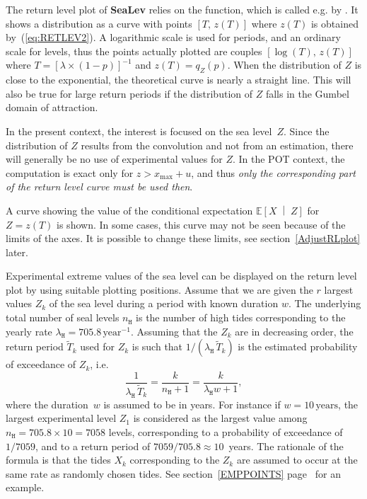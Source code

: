 \documentclass[11pt,a4paper]{report}\usepackage[]{graphicx}\usepackage[]{color}
\newcommand{\Esp}{\mathbb{E}}
\newcommand{\bCond}[2]{\left[ #1 \;\middle\vert\; #2 \right]}
\newcommand{\Up}[1]{#1_{\mathrm{max}}}
\begin{document}
The return level plot of \textbf{SeaLev} relies on the \verb@RSLplot@
function, which is called e.g. by \verb@convSL@. It shows a distribution as
a curve with points $[T,\,z(T)]$ where $z(T)$ is obtained
by~(\ref{eq:RETLEV2}). A logarithmic scale is used for periods, and an
ordinary scale for levels, thus the points actually plotted are
couples $[\log(T),\,z(T)]$ where $T = [\lambda \times(1-p)]^{-1}$ and
$z(T)= q_Z(p)$. When the distribution of $Z$ is close to the
exponential, the theoretical curve is nearly a straight line. This
will also be true for large return periods if the distribution of $Z$
falls in the Gumbel domain of attraction.

In the present context, the interest is focused on the sea level~$Z$.
Since the distribution of $Z$ results from the convolution and not from an
estimation, there will generally be no use of experimental
values for $Z$. In the POT context, the computation is exact only
for $z > \Up{x} + u$, and thus \textit{only the corresponding part of the
return level curve must be used then}.

A curve showing the value of the conditional expectation $\Esp\bCond{X}{Z}$
for $Z = z(T)$ is shown. In some cases, this curve may not be seen because
of the limits of the axes. It is possible to change these limits, see
section~\ref{AdjustRLplot} later.

Experimental extreme values of the sea level can be displayed on the return
level plot by using suitable plotting positions.  
Assume that we are given the $r$ largest values $Z_k$ of the sea level during a
period with known duration $w$. The underlying total number of seal levels
$n_{\texttt{H}}$ is the number of high tides corresponding to the yearly rate
$\lambda_{\texttt{H}} =705.8\,{\textrm{year}}^{-1}$. Assuming that the $Z_k$ are
in decreasing order, the return period $\widetilde{T}_k$ used for $Z_k$ is such
that $1/(\lambda_{\texttt{H}}\,\widetilde{T}_k)$ is the estimated probability of
exceedance of $Z_k$, i.e.
$$
    \frac{1}{\lambda_{\texttt{H}}\,\widetilde{T}_k} = \frac{k}{n_{\texttt{H}}+1} = 
    \frac{k}{\lambda_{\texttt{H}} w +1}, 
$$
where the duration~$w$ is assumed to be in years. For instance if $w=10\,\textrm{years}$,
the largest experimental level $Z_1$ is considered as the largest 
value among $n_{\texttt{H}}=705.8 \times 10 = 7058$ levels, corresponding
to a probability of exceedance of $1/7059$, and to a return period 
of $7059/705.8 \approx 10$~years.
The rationale of the formula is
that the tides $X_k$ corresponding to the $Z_k$ are assumed to occur
at the same rate as randomly chosen tides. See section~\ref{EMPPOINTS} 
page~\pageref{EMPPOINTS} for an example.
\end{document}
